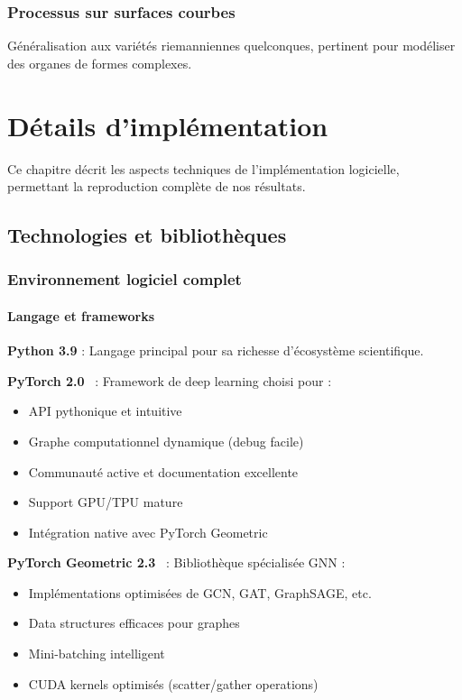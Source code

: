 \subsection{Processus sur surfaces courbes}
Généralisation aux variétés riemanniennes quelconques, pertinent pour modéliser des organes de formes complexes.

\chapter{Détails d'implémentation}

Ce chapitre décrit les aspects techniques de l'implémentation logicielle, permettant la reproduction complète de nos résultats.

\section{Technologies et bibliothèques}

\subsection{Environnement logiciel complet}

\subsubsection{Langage et frameworks}

\textbf{Python 3.9} : Langage principal pour sa richesse d'écosystème scientifique.

\textbf{PyTorch 2.0}~\cite{Paszke2019} : Framework de deep learning choisi pour :
\begin{itemize}
    \item API pythonique et intuitive
    \item Graphe computationnel dynamique (debug facile)
    \item Communauté active et documentation excellente
    \item Support GPU/TPU mature
    \item Intégration native avec PyTorch Geometric
\end{itemize}

\textbf{PyTorch Geometric 2.3}~\cite{Fey2019} : Bibliothèque spécialisée GNN :
\begin{itemize}
    \item Implémentations optimisées de GCN, GAT, GraphSAGE, etc.
    \item Data structures efficaces pour graphes
    \item Mini-batching intelligent
    \item CUDA kernels optimisés (scatter/gather operations)
\end{itemize}

